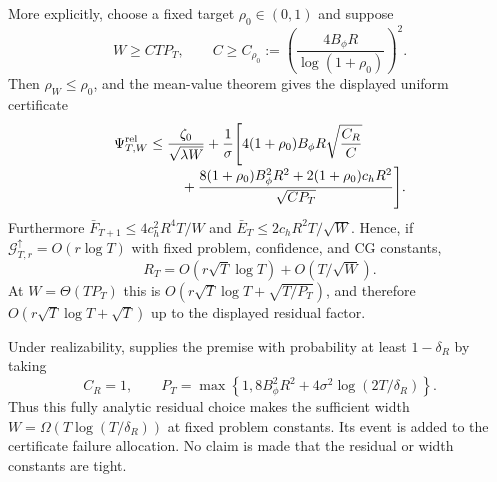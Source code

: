 \begin{corollary}
More explicitly, choose a fixed target $\rho_0\in(0,1)$ and suppose
\begin{equation}\label{eq:scaled-tanh-linear-width}
 W\ge CTP_T,\qquad
 C\ge C_{\rho_0}:=
 \left(\frac{4B_\phi R}{\log(1+\rho_0)}\right)^2.
\end{equation}
Then $\rho_W\le\rho_0$, and the mean-value theorem gives the displayed
uniform certificate
\begin{equation}\label{eq:scaled-tanh-psi-uniform}
\begin{aligned}
 \Psi^{\rm rel}_{T,W}\le{}&\frac{\zeta_0}{\sqrt{\lambda W}}
 +\frac1\sigma\Biggl[
 4(1+\rho_0)B_\phi R\sqrt{\frac{C_R}{C}}\\[-1mm]
 &\quad+\frac{8(1+\rho_0)B_\phi^2R^2
 +2(1+\rho_0)c_hR^2}{\sqrt{CP_T}}\Biggr].
\end{aligned}
\end{equation}
Furthermore
$\bar F_{T+1}\le4c_h^2R^4T/W$ and
$\bar E_T\le2c_hR^2T/\sqrt W$.  Hence, if
$\mathcal G^\uparrow_{T,r}=O(r\log T)$ with fixed problem, confidence, and CG
constants,
\[
 R_T=O(r\sqrt T\log T)+O(T/\sqrt W).
\]
At $W=\Theta(TP_T)$ this is
$O(r\sqrt T\log T+\sqrt{T/P_T})$, and therefore
$O(r\sqrt T\log T+\sqrt T)$ up to the displayed residual factor.

Under realizability,  supplies the premise
with probability at least $1-\delta_R$ by taking
\begin{equation}\label{eq:scaled-tanh-residual-factor}
 C_R=1,\qquad
 P_T=\max\!\left\{1,
 8B_\phi^2R^2+4\sigma^2\log(2T/\delta_R)\right\}.
\end{equation}
Thus this fully analytic residual choice makes the sufficient width
$W=\Omega(T\log(T/\delta_R))$ at fixed problem constants.  Its event is
added to the certificate failure allocation.  No claim is made that the
residual or width constants are tight.
\end{corollary}
